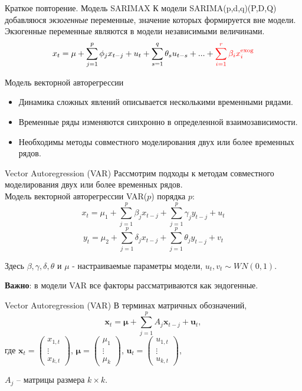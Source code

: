 \begin{frame}{Краткое повторение. Модель SARIMAX}
К модели SARIMA(p,d,q)(P,D,Q) добавляюся \textit{экзогенные} переменные, значение которых формируется вне модели.
Экзогенные переменные являются в модели независимыми величинами.
\begin{equation*}
x_t = \mu + \sum_{j=1}^{p}\phi_j x_{t-j} + u_t + \sum_{s=1}^{q}\theta_s u_{t-s} +...+ \textcolor{red}{\sum_{i=1}^{r}\beta_i x^{\text{exog}}_i}
\end{equation*}

\end{frame}
\begin{frame}{Модель векторной авторегрессии}
    \begin{itemize}
    \item Динамика сложных явлений описывается несколькими временными рядами.
    \item Временные ряды изменяются синхронно в определенной взаимозависимости.
    \item Необходимы методы совместного моделирования двух или более временных рядов.
    \end{itemize}
\end{frame}
\begin{frame}{Vector Autoregression (VAR)}
Рассмотрим подходы к методам совместного моделирования двух или более временных рядов. \\
\vspace{0.2cm}
Модель векторной авторегрессии VAR($p$) порядка $p$:
$$ x_t = \mu_1 + \sum_{j=1}^p \beta_j x_{t-j} + \sum_{j=1}^p \gamma_j y_{t-j} + u_t$$
$$ y_t = \mu_2 + \sum_{j=1}^p \delta_j x_{t-j} + \sum_{j=1}^p \theta_j y_{t-j} + v_t$$

Здесь $\beta, \gamma, \delta, \theta$ и $\mu$ - настраиваемые параметры модели, $u_t, v_t \sim WN(0,1)$.

\vspace{0.5cm}

\textbf{Важно}: в модели VAR все факторы рассматриваются как эндогенные.
\end{frame}
\begin{frame}{Vector Autoregression (VAR)}
В терминах матричных обозначений,
$$ \mathbf{x}_t = \boldsymbol{\mu} + \sum_{j=1}^p A_j \mathbf{x}_{t-j} + \mathbf{u}_t,$$
где $\mathbf{x}_t = 
\begin{pmatrix}
x_{1,t} \\
\vdots \\
x_{k,t}
\end{pmatrix}
$, 
$\boldsymbol{\mu} = 
\begin{pmatrix}
\mu_1 \\
\vdots \\
\mu_k
\end{pmatrix}
$, 
$\mathbf{u}_t = 
\begin{pmatrix}
u_{1,t} \\
\vdots \\
u_{k,t}
\end{pmatrix}
$, \\
\vspace{0.3cm}

$A_j$ -- матрицы размера $k \times k$.
\end{frame}
